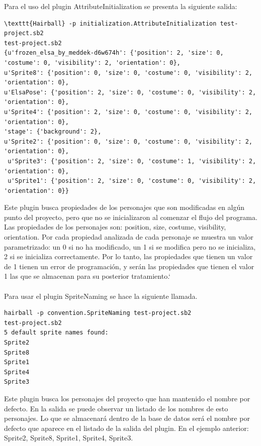 \documentclass[a4paper, 12pt]{book}
\begin{document}
Para el uso del plugin AttributeInitialization se presenta la siguiente salida:

\begingroup
\fontsize{7pt}{8pt}\selectfont
\begin{verbatim}
\texttt{Hairball} -p initialization.AttributeInitialization test-project.sb2 
test-project.sb2
{u'frozen_elsa_by_meddek-d6w674h': {'position': 2, 'size': 0, 'costume': 0, 'visibility': 2, 'orientation': 0}, 
u'Sprite8': {'position': 0, 'size': 0, 'costume': 0, 'visibility': 2, 'orientation': 0}, 
u'ElsaPose': {'position': 2, 'size': 0, 'costume': 0, 'visibility': 2, 'orientation': 0}, 
u'Sprite4': {'position': 2, 'size': 0, 'costume': 0, 'visibility': 2, 'orientation': 0}, 
'stage': {'background': 2}, 
u'Sprite2': {'position': 0, 'size': 0, 'costume': 0, 'visibility': 2, 'orientation': 0},
 u'Sprite3': {'position': 2, 'size': 0, 'costume': 1, 'visibility': 2, 'orientation': 0},
 u'Sprite1': {'position': 2, 'size': 0, 'costume': 0, 'visibility': 2, 'orientation': 0}}
\end{verbatim}
\endgroup

Este plugin busca propiedades de los personajes que son modificadas en algún punto del 
proyecto, pero que no se inicializaron al comenzar el flujo del programa. Las propiedades 
de los personajes son: position, size, costume, visibility, orientation. Por cada propiedad
analizada de cada personaje se muestra un valor parametrizado: un 0 si no ha modificado, un
1 si se modifica pero no se inicializa, 2 si se inicializa correctamente. Por lo tanto, las
propiedades que tienen un valor de 1 tienen un error de programación, y serán las propiedades
que tienen el valor 1 las que se almacenan para su posterior tratamiento.`\\ \\

Para usar el plugin SpriteNaming se hace la siguiente llamada.
\begingroup
\fontsize{7pt}{8pt}\selectfont
\begin{verbatim}
hairball -p convention.SpriteNaming test-project.sb2 
test-project.sb2
5 default sprite names found:
Sprite2
Sprite8
Sprite1
Sprite4
Sprite3
\end{verbatim}
\endgroup

Este plugin busca los personajes del proyecto que han mantenido el nombre por defecto. En
la salida se puede observar un listado de los nombres de esto personajes. Lo que se 
almacenará dentro de la base de datos será el nombre por defecto que aparece en el listado
de la salida del plugin. En el ejemplo anterior: Sprite2, Sprite8, Sprite1, Sprite4, Sprite3.
\end{document}
